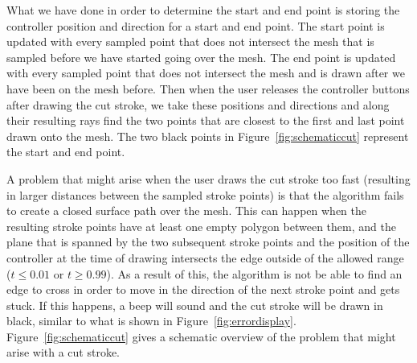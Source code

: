 What we have done in order to determine the start and end point is storing the controller position and direction for a start and end point. The start point is updated with every sampled point that does not intersect the mesh that is sampled before we have started going over the mesh. The end point is updated with every sampled point that does not intersect the mesh and is drawn after we have been on the mesh before. Then when the user releases the controller buttons after drawing the cut stroke, we take these positions and directions and along their resulting rays find the two points that are closest to the first and last point drawn onto the mesh. The two black points in Figure~\ref{fig:schematiccut} represent the start and end point. 

A problem that might arise when the user draws the cut stroke too fast (resulting in larger distances between the sampled stroke points) is that the algorithm fails to create a closed surface path over the mesh. This can happen when the resulting stroke points have at least one empty polygon between them, and the plane that is spanned by the two subsequent stroke points and the position of the controller at the time of drawing intersects the edge outside of the allowed range ($t \leq 0.01$ or $t \geq 0.99$). As a result of this, the algorithm is not be able to find an edge to cross in order to move in the direction of the next stroke point and gets stuck. If this happens, a beep will sound and the cut stroke will be drawn in black, similar to what is shown in Figure~\ref{fig:errordisplay}. Figure~\ref{fig:schematiccut} gives a schematic overview of the problem that might arise with a cut stroke.

